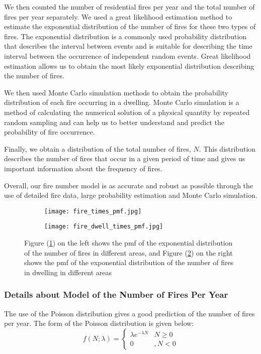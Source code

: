 \documentclass[12pt]{article}  %
\begin{document}
We then counted the number of residential fires per year and the total number of fires 
per year separately. We used a great likelihood estimation method to estimate the exponential 
distribution of the number of fires for these two types of fires. The exponential distribution 
is a commonly used probability distribution that describes the interval between events 
and is suitable for describing the time interval between the occurrence of independent 
random events. Great likelihood estimation allows us to obtain the most likely exponential 
distribution describing the number of fires.

We then used Monte Carlo simulation methods to obtain the probability distribution of 
each fire occurring in a dwelling. Monte Carlo simulation is a method of calculating 
the numerical solution of a physical quantity by repeated random sampling and can 
help us to better understand and predict the probability of fire occurrence.

Finally, we obtain a distribution of the total number of fires, $N$. 
This distribution describes the number of fires that occur in a given 
period of time and gives us important information about the frequency of fires.

Overall, our fire number model is as accurate and robust as possible through 
the use of detailed fire data, large probability estimation and Monte Carlo simulation.

\begin{figure}[htbp]
\centering
\begin{subfigure}[b]{.45\textwidth}
\texttt{[image: fire\_times\_pmf.jpg]}
\caption{}\label{subfig:fireall}
\end{subfigure}
\begin{subfigure}[b]{.45\textwidth}
\texttt{[image: fire\_dwell\_times\_pmf.jpg]}
\caption{}\label{subfig:firedwell}
\end{subfigure}
\caption{Figure (\ref{subfig:fireall}) on the left shows the pmf of the exponential distribution of the number of 
fires in different areas, and Figure (\ref{subfig:firedwell}) on the right shows the pmf of the exponential distribution 
of the number of fires in dwelling in different areas}\label{fig:firepmf}
\end{figure}

\subsubsection{Details about Model of the Number of Fires Per Year}
The use of the Poisson distribution gives a good prediction of the number of fires per year.\textsuperscript{\cite{poisson, firepossion}}
The form of the Poisson distribution is given below:
\begin{equation}
    f(N ; \lambda)=\left\{\begin{array}{cc}
        \lambda e^{-\lambda N} & N \geq 0 \\
        0 & , N<0
        \end{array}\right.
\end{equation}
\end{document}
